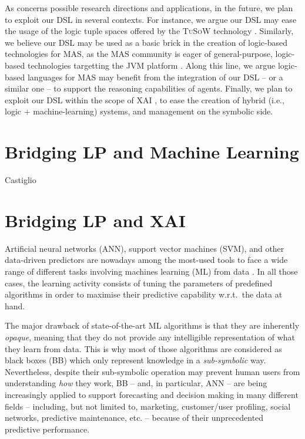 \documentclass[12pt,a4paper,openright,twoside]{book}
\begin{document}
As concerns possible research directions and applications, in the future, we plan to exploit our DSL in several contexts.
%
For instance, we argue our DSL may ease the usage of the logic tuple spaces offered by the \textsc{TuSoW} technology \cite{tusow-icccn2019}.
%
Similarly, we believe our DSL may be used as a basic brick in the creation of logic-based technologies for MAS, as the MAS community is eager of general-purpose, logic-based technologies targetting the JVM platform \cite{lptech4mas-jaamas35}.
%
Along this line, we argue logic-based languages for MAS may benefit from the integration of our DSL -- or a similar one -- to support the reasoning capabilities of agents.
%
Finally, we plan to exploit our DSL within the scope of XAI \cite{xaisurvey-ia14}, to ease the creation of hybrid (i.e., logic + machine-learning) systems, and management on the symbolic side.


\chapter{Bridging LP and Machine Learning}

Castiglio

\chapter{Bridging LP and XAI}

Artificial neural networks (ANN), support vector machines (SVM), and other data-driven predictors are nowadays among the most-used tools to face a wide range of different tasks involving machines learning (ML) from data \cite{rocha2012far}.
%
In all those cases, the learning activity consists of tuning the parameters of predefined algorithms in order to maximise their predictive capability w.r.t.\ the data at hand.

The major drawback of state-of-the-art ML algorithms is that they are inherently \emph{opaque}, meaning that they do not provide any intelligible representation of what they learn from data.
%
This is why most of those algorithms are considered as black boxes (BB) which only represent knowledge in a \emph{sub-symbolic} way.
%
Nevertheless, despite their sub-symbolic operation may prevent human users from understanding \emph{how} they work, BB -- and, in particular, ANN -- are being increasingly applied to support forecasting and decision making in many different fields -- including, but not limited to, marketing, customer/user profiling, social networks, predictive maintenance, etc. -- because of their unprecedented predictive performance.
\end{document}
